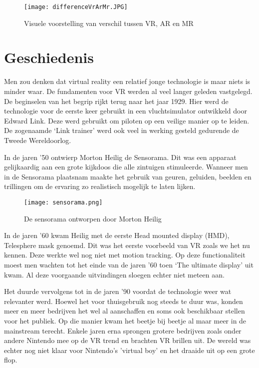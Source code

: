 \begin{figure}[h]
    \centering
    \texttt{[image: differenceVrArMr.JPG]}
    \caption{Visuele voorstelling van verschil tussen VR, AR en MR}
\end{figure}

\section{Geschiedenis}

Men zou denken dat virtual reality een relatief jonge technologie is maar niets is minder waar. De fundamenten voor VR werden al veel langer geleden vastgelegd. De beginselen van het begrip rijkt terug naar het jaar 1929. Hier werd de technologie voor de eerste keer gebruikt in een vluchtsimulator ontwikkeld door Edward Link. Deze werd gebruikt om piloten op een veilige manier op te leiden. De zogenaamde ‘Link trainer’ werd ook veel in werking gesteld gedurende de Tweede Wereldoorlog.


In de jaren ’50 ontwierp Morton Heilig de Sensorama. Dit was een apparaat gelijkaardig aan een grote kijkdoos die alle zintuigen stimuleerde. Wanneer men in de Sensorama plaatsnam maakte het gebruik van geuren, geluiden, beelden en trillingen om de ervaring zo realistisch mogelijk te laten lijken. 

\begin{figure}[h]
    \centering
    \texttt{[image: sensorama.png]}
    \caption{De sensorama ontworpen door Morton Heilig}
\end{figure}

In de jaren ’60 kwam Heilig met de eerste Head mounted display (HMD), Telesphere mask genoemd. Dit was het eerste voorbeeld van VR zoals we het nu kennen. Deze werkte wel nog niet met motion tracking.
Op deze functionaliteit moest men wachten tot het einde van de jaren ’60 toen ‘The ultimate display’ uit kwam.
Al deze voorgaande uitvindingen sloegen echter niet meteen aan.

Het duurde vervolgens tot in de jaren ’90 voordat de technologie weer wat relevanter werd. Hoewel het voor thuisgebruik nog steeds te duur was, konden meer en meer bedrijven het wel al aanschaffen en soms ook beschikbaar stellen voor het publiek. Op die manier kwam het beetje bij beetje al maar meer in de mainstream terecht. Enkele jaren erna sprongen grotere bedrijven zoals onder andere Nintendo mee op de VR trend en brachten VR brillen uit. De wereld was echter nog niet klaar voor Nintendo's 'virtual boy' en het draaide uit op een grote flop. 

